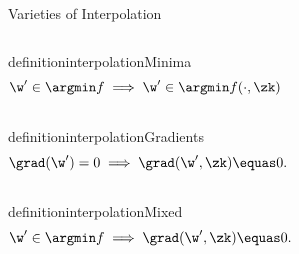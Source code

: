 \documentclass[mathserif,notheorems, hyperref={colorlinks, citecolor=blue, urlcolor=blue, linkcolor=blue}]{beamer}
\begin{document}
\begin{frame}{Varieties of Interpolation}
	\begin{columns}[c]
		\begin{restatable}{definition}{interpolationMinima}\label{def:interpolation-minima}
			\vspace{-5ex}
			\[ \w' \in \argmin f \implies \w' \in \argmin f(\cdot, \zk) \]
		\end{restatable}

		
	\end{columns}

	\pause

	\begin{columns}[c]
		\vspace{-3ex}
		\begin{restatable}{definition}{interpolationGradients}\label{def:interpolation-gradients}
			\vspace{-1ex}
			\[ \grad(\w') = 0 \implies \grad(\w', \zk) \equas 0. \]
		\end{restatable}

		
	\end{columns}

	\pause

	\begin{columns}[c]
		\vspace{-6ex}
		\begin{restatable}{definition}{interpolationMixed}\label{def:interpolation-mixed}
			\vspace{-1ex}
			\[ \w' \in \argmin f \implies \grad(\w', \zk) \equas 0. \]
		\end{restatable}

		
	\end{columns}
\end{frame}
\end{document}
